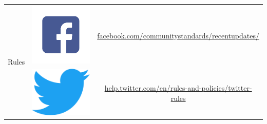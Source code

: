 \documentclass{article}
\begin{document}
\begin{table}[h]
\begin{tabular}{|c|c|c|}
\hline
\multirow{3}{*}{Rules}                     & \includegraphics[scale=0.05]{./img/fb_logo.png} & \href{https://www.facebook.com/communitystandards/recentupdates/}{facebook.com/communitystandards/recentupdates/}                         \\ \cline{2-3} 
                                           & \includegraphics[scale=0.007]{./img/tw_logo.png}   & \href{https://help.twitter.com/en/rules-and-policies/twitter-rules}{help.twitter.com/en/rules-and-policies/twitter-rules}                       \\ \cline{2-3} 

\end{tabular}
\end{table}
\end{document}
